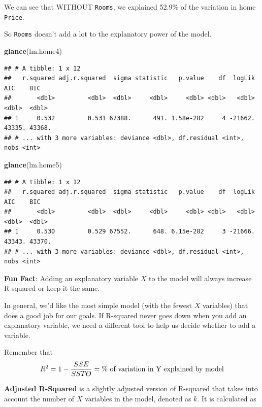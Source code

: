 \documentclass[
]{book}
\newenvironment{Shaded}{\begin{snugshade}}{\end{snugshade}}
\newcommand{\KeywordTok}[1]{\textcolor[rgb]{0.13,0.29,0.53}{\textbf{#1}}}
\newcommand{\NormalTok}[1]{#1}
\begin{document}
We can see that WITHOUT \texttt{Rooms}, we explained 52.9\% of the variation in home \texttt{Price}.

So \texttt{Rooms} doesn't add a lot to the explanatory power of the model.

\begin{Shaded}
\begin{Highlighting}[]
\KeywordTok{glance}\NormalTok{(lm.home4)}
\end{Highlighting}
\end{Shaded}

\begin{verbatim}
## # A tibble: 1 x 12
##   r.squared adj.r.squared  sigma statistic   p.value    df  logLik    AIC    BIC
##       <dbl>         <dbl>  <dbl>     <dbl>     <dbl> <dbl>   <dbl>  <dbl>  <dbl>
## 1     0.532         0.531 67388.      491. 1.58e-282     4 -21662. 43335. 43368.
## # ... with 3 more variables: deviance <dbl>, df.residual <int>, nobs <int>
\end{verbatim}

\begin{Shaded}
\begin{Highlighting}[]
\KeywordTok{glance}\NormalTok{(lm.home5)}
\end{Highlighting}
\end{Shaded}

\begin{verbatim}
## # A tibble: 1 x 12
##   r.squared adj.r.squared  sigma statistic   p.value    df  logLik    AIC    BIC
##       <dbl>         <dbl>  <dbl>     <dbl>     <dbl> <dbl>   <dbl>  <dbl>  <dbl>
## 1     0.530         0.529 67552.      648. 6.15e-282     3 -21666. 43343. 43370.
## # ... with 3 more variables: deviance <dbl>, df.residual <int>, nobs <int>
\end{verbatim}

\textbf{Fun Fact}: Adding an explanatory variable \(X\) to the model will always increase R-squared or keep it the same.

In general, we'd like the most simple model (with the fewest \(X\) variables) that does a good job for our goals. If R-squared never goes down when you add an explanatory variable, we need a different tool to help us decide whether to add a variable.

Remember that
\[R^2 = 1 - \frac{SSE}{SSTO} = \%\hbox{ of variation in Y explained by model}\]

\textbf{Adjusted R-Squared} is a slightly adjusted version of R-squared that takes into account the number of \(X\) variables in the model, denoted as \(k\). It is calculated as
\end{document}

